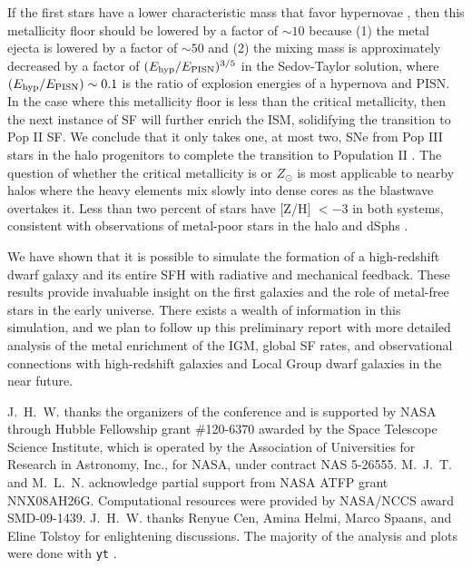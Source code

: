 \documentclass{PoS}
\begin{document}
If the first stars have a lower characteristic mass that favor
hypernovae \citep{Tumlinson07_IMF}, then this metallicity floor should
be lowered by a factor of $\sim 10$ because (1) the metal ejecta is
lowered by a factor of $\sim 50$ and (2) the mixing mass is
approximately decreased by a factor of $(E_{\rm hyp}/E_{\rm
  PISN})^{3/5}$ in the Sedov-Taylor solution, where $(E_{\rm
  hyp}/E_{\rm PISN}) \sim 0.1$ is the ratio of explosion energies of a
hypernova and PISN.  In the case where this metallicity floor is less
than the critical metallicity, then the next instance of SF will
further enrich the ISM, solidifying the transition to Pop II SF.  We
conclude that it only takes one, at most two, SNe from Pop III stars
in the halo progenitors to complete the transition to Population II
\citep{Frebel10}.  The question of whether the critical metallicity is
 or  $Z_\odot$ is most applicable to nearby
halos where the heavy elements mix slowly into dense cores as the
blastwave overtakes it.  Less than two percent of stars have [Z/H] $<
-3$ in both systems, consistent with observations of metal-poor stars
in the halo and dSphs \citep{Beers05, Battaglia10}.

We have shown that it is possible to simulate the formation of a
high-redshift dwarf galaxy and its entire SFH with radiative and
mechanical feedback.  These results provide invaluable insight on the
first galaxies and the role of metal-free stars in the early universe.
There exists a wealth of information in this simulation, and we plan
to follow up this preliminary report with more detailed analysis of
the metal enrichment of the IGM, global SF rates, and observational
connections with high-redshift galaxies and Local Group dwarf galaxies
in the near future.

\acknowledgments

J.~H.~W. thanks the organizers of the conference and is supported by
NASA through Hubble Fellowship grant \#120-6370 awarded by the Space
Telescope Science Institute, which is operated by the Association of
Universities for Research in Astronomy, Inc., for NASA, under contract
NAS 5-26555.  M.~J.~T. and M.~L.~N. acknowledge partial support from
NASA ATFP grant NNX08AH26G.  Computational resources were provided by
NASA/NCCS award SMD-09-1439.  J.~H.~W. thanks Renyue Cen, Amina Helmi,
Marco Spaans, and Eline Tolstoy for enlightening discussions.  The
majority of the analysis and plots were done with \texttt{yt}
\citep{yt_full_paper}.
\end{document}
